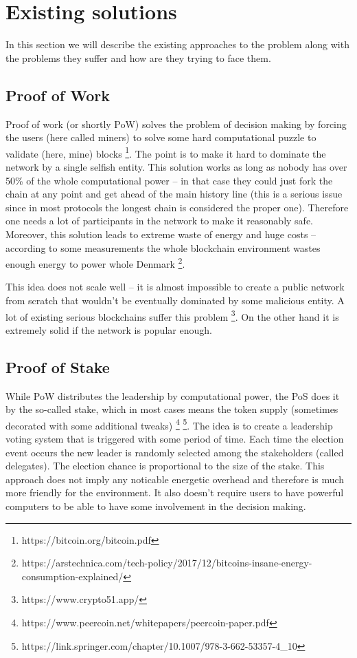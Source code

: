 \section{Existing solutions}

In this section we will describe the existing approaches to the problem along
with the problems they suffer and how are they trying to face them.

\subsection{Proof of Work}

Proof of work (or shortly PoW) solves the problem of decision making by forcing the
users (here called miners) to solve some hard computational puzzle to validate
(here, mine) blocks \footnote{https://bitcoin.org/bitcoin.pdf}.
The point is to make it hard to dominate the network by a
single selfish entity. This solution works as long as nobody has over 50\% of the whole
computational power – in that case they could just fork the chain at any point
and get ahead of the main history line (this is a serious issue since in most
protocols the longest chain is considered the proper one). Therefore one needs a
lot of participants in the network to make it reasonably safe. Moreover, this
solution leads to extreme waste of energy and huge costs – according to some
measurements the whole blockchain environment wastes enough energy to power
whole Denmark
\footnote{https://arstechnica.com/tech-policy/2017/12/bitcoins-insane-energy-consumption-explained/}.

This idea does not scale well – it is almost impossible to create a public
network from scratch that wouldn't be eventually dominated by some malicious
entity. A lot of existing serious blockchains suffer this problem
\footnote{https://www.crypto51.app/}. On the other hand it is extremely solid if
the network is popular enough.

\subsection{Proof of Stake}

While PoW distributes the leadership by computational power, the PoS does it by
the so-called stake, which in most cases means the token supply (sometimes decorated
with some additional tweaks)
\footnote{https://www.peercoin.net/whitepapers/peercoin-paper.pdf}
\footnote{https://link.springer.com/chapter/10.1007/978-3-662-53357-4\_10}.
The idea is to create a leadership voting system
that is triggered with some period of time. Each time the election event occurs
the new leader is randomly selected among the stakeholders (called delegates).
The election chance is proportional to the size of the stake. This approach does
not imply any noticable energetic overhead and therefore is much more friendly for the
environment. It also doesn't require users to have powerful computers to be able to
have some involvement in the decision making.

